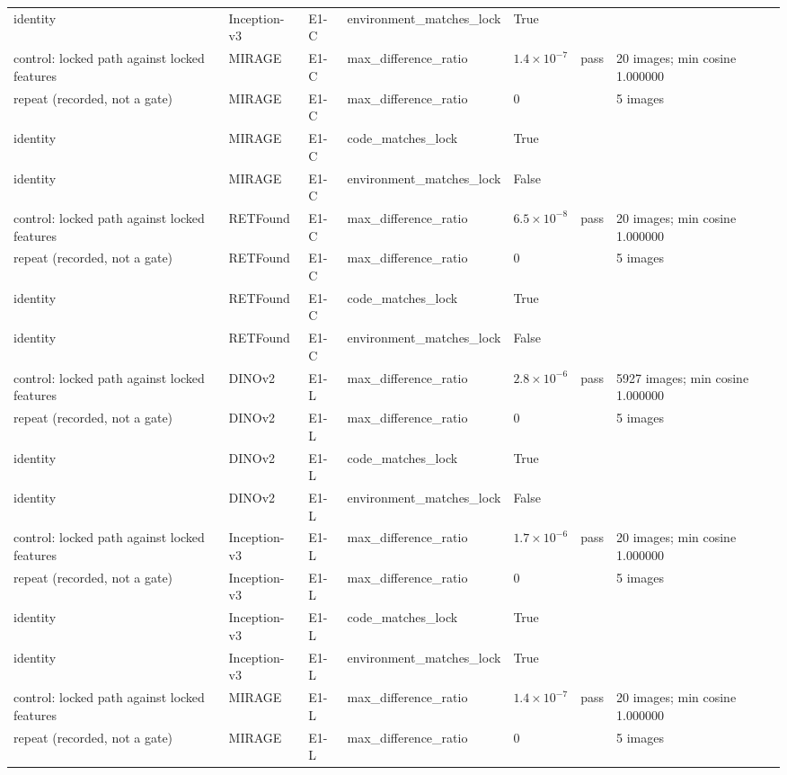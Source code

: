 \begin{longtable}{@{}p{3.3cm}lp{1.5cm}p{3.6cm}p{2.2cm}p{1.6cm}p{3.2cm}@{}}
identity & Inception-v3 & E1-C & environment\_matches\_lock & True &  &  \\
control: locked path against locked features & MIRAGE & E1-C & max\_difference\_ratio & $1.4\times10^{-7}$ & pass & 20 images; min cosine 1.000000 \\
repeat (recorded, not a gate) & MIRAGE & E1-C & max\_difference\_ratio & 0 &  & 5 images \\
identity & MIRAGE & E1-C & code\_matches\_lock & True &  &  \\
identity & MIRAGE & E1-C & environment\_matches\_lock & False &  &  \\
control: locked path against locked features & RETFound & E1-C & max\_difference\_ratio & $6.5\times10^{-8}$ & pass & 20 images; min cosine 1.000000 \\
repeat (recorded, not a gate) & RETFound & E1-C & max\_difference\_ratio & 0 &  & 5 images \\
identity & RETFound & E1-C & code\_matches\_lock & True &  &  \\
identity & RETFound & E1-C & environment\_matches\_lock & False &  &  \\
control: locked path against locked features & DINOv2 & E1-L & max\_difference\_ratio & $2.8\times10^{-6}$ & pass & 5927 images; min cosine 1.000000 \\
repeat (recorded, not a gate) & DINOv2 & E1-L & max\_difference\_ratio & 0 &  & 5 images \\
identity & DINOv2 & E1-L & code\_matches\_lock & True &  &  \\
identity & DINOv2 & E1-L & environment\_matches\_lock & False &  &  \\
control: locked path against locked features & Inception-v3 & E1-L & max\_difference\_ratio & $1.7\times10^{-6}$ & pass & 20 images; min cosine 1.000000 \\
repeat (recorded, not a gate) & Inception-v3 & E1-L & max\_difference\_ratio & 0 &  & 5 images \\
identity & Inception-v3 & E1-L & code\_matches\_lock & True &  &  \\
identity & Inception-v3 & E1-L & environment\_matches\_lock & True &  &  \\
control: locked path against locked features & MIRAGE & E1-L & max\_difference\_ratio & $1.4\times10^{-7}$ & pass & 20 images; min cosine 1.000000 \\
repeat (recorded, not a gate) & MIRAGE & E1-L & max\_difference\_ratio & 0 &  & 5 images \\

\end{longtable}
